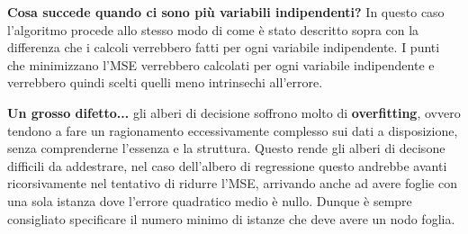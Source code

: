\documentclass[a4paper, 11pt, oneside]{report}
\begin{document}
                \bigskip
                \par \noindent \textbf{Cosa succede quando ci sono più variabili indipendenti?} In questo caso l'algoritmo
                procede allo stesso modo di come è stato descritto sopra con la differenza che i calcoli verrebbero fatti
                per ogni variabile indipendente. I punti che minimizzano l'MSE verrebbero calcolati per ogni variabile
                indipendente e verrebbero quindi scelti quelli meno intrinsechi all'errore.
                \\
                \par \noindent \textbf{Un grosso difetto...} gli alberi di decisione soffrono molto di \textbf{overfitting},
                ovvero tendono a fare un ragionamento eccessivamente complesso sui dati a disposizione, senza comprenderne
                l'essenza e la struttura. Questo rende gli alberi di decisone difficili da addestrare, nel caso dell'albero
                di regressione questo andrebbe avanti ricorsivamente nel tentativo di ridurre l'MSE, arrivando anche ad
                avere foglie con una sola istanza dove l'errore quadratico medio è nullo. Dunque è sempre consigliato
                specificare il numero minimo di istanze che deve avere un nodo foglia.
                \\
                \newpage
\end{document}
